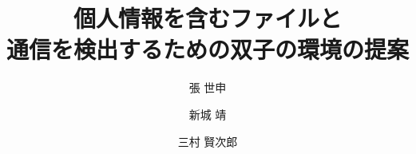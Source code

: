 \documentclass{ipsjpapers}
\def\LATEx{\iLATEX\normalsize}
\def\iLATEX#1{L\kern-.36em\raise.3ex\hbox{#1\bf A}\kern-.15em
    T\kern-.1667em\lower.7ex\hbox{E}\kern-.125emX}
\begin{document}

\title{個人情報を含むファイルと\\通信を検出するための双子の環境の提案}


\author{張 世申 
             \and 新城 靖 
             \and 三村 賢次郎 }



\maketitle

\end{document}
